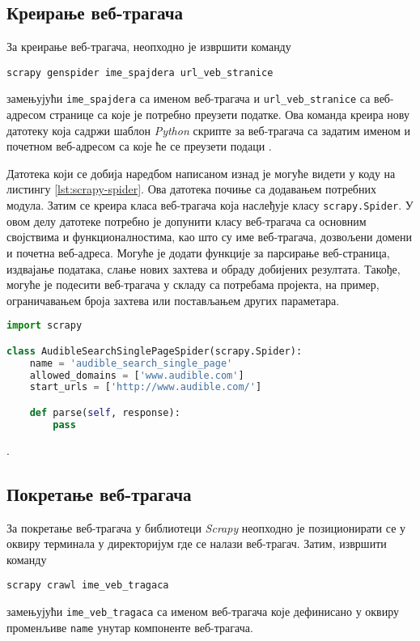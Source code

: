 \documentclass[12pt,oneside]{memoir}
\begin{document}
\subsection{Креирање веб-трагача}
За креирање веб-трагача, неопходно је извршити команду
\begin{verbatim}
scrapy genspider ime_spajdera url_veb_stranice
\end{verbatim}
замењујући \texttt{ime\_spajdera} са именом веб-трагача и \texttt{url\_veb\_stranice} са веб-адресом странице са које је потребно преузети податке. Ова команда креира нову датотеку која садржи шаблон \textit{Python} скрипте за веб-трагача са задатим именом и почетном веб-адресом са које ће се преузети подаци \cite{WebScrapingWithPython}.

Датотека који се добија наредбом написаном изнад је могуће видети у коду на листингу \ref{lst:scrapy-spider}. Ова датотека почиње са додавањем потребних модула. Затим се креира класа веб-трагача која наслеђује класу \texttt{scrapy.Spider}. У овом делу датотеке потребно је допунити класу веб-трагача са основним својствима и функционалностима, као што су име веб-трагача, дозвољени домени и почетна веб-адреса. Могуће је додати функције за парсирање веб-страница, издвајање података, слање нових захтева и обраду добијених резултата. Такође, могуће је подесити веб-трагача у складу са потребама пројекта, на пример, ограничавањем броја захтева или постављањем других параметара. 

\begin{lstlisting}[language=Python, caption={Шаблон веб-трагача}, label={lst:scrapy-spider}]
import scrapy

class AudibleSearchSinglePageSpider(scrapy.Spider):
    name = 'audible_search_single_page'
    allowed_domains = ['www.audible.com']
    start_urls = ['http://www.audible.com/']

    def parse(self, response):
        pass
\end{lstlisting}.

\subsection{Покретање веб-трагача}
За покретање веб-трагача у библиотеци \textit{Scrapy} неопходно је позиционирати се у оквиру терминала у директоријум где се налази веб-трагач. Затим, извршити команду
\begin{verbatim}
scrapy crawl ime_veb_tragaca
\end{verbatim}
замењујући \texttt{ime\_veb\_tragaca} са именом веб-трагача које дефинисано у оквиру променљиве \texttt{name} унутар компоненте веб-трагача. 
\end{document}
